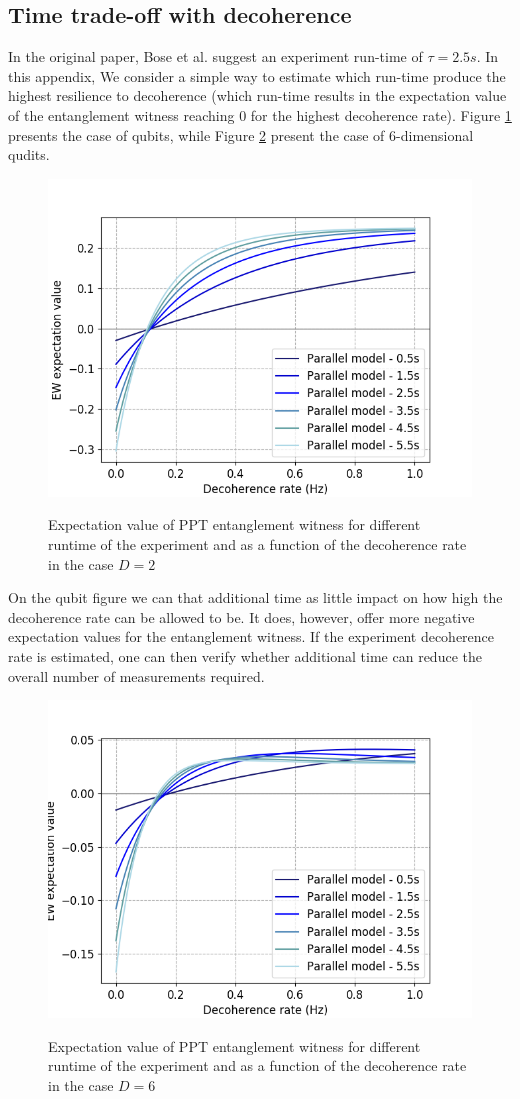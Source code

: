 \documentclass[%
 12pt,
 superscriptaddress,
 amsmath,
 amssymb,
 onecolumn,
 longbibliography
]{revtex4-2}
\begin{document}
\begin{appendices}
\section{Time trade-off with decoherence} \label{sec:time_opt}

\indent In the original paper, Bose et al. suggest an experiment run-time of $\tau=2.5s$. In this appendix, We consider a simple way to estimate which run-time produce the highest resilience to decoherence (which run-time results in the expectation value of the entanglement witness reaching $0$ for the highest decoherence rate). Figure \ref{fig:deco_para_runtime2} presents the case of qubits, while Figure \ref{fig:deco_para_runtime6} present the case of 6-dimensional qudits. 
	\begin{figure}
	\centering
		\includegraphics[width=0.5\columnwidth]{EW_para_deco_diff_time_d2.png}\par\medskip
	    \caption{Expectation value of PPT entanglement witness for different runtime of the experiment and as a function of the decoherence rate in the case $D=2$}\label{fig:deco_para_runtime2}
	\textit{}
	\end{figure}

\indent On the qubit figure we can that additional time as little impact on how high the decoherence rate can be allowed to be. It does, however, offer more negative expectation values for the entanglement witness. If the experiment decoherence rate is estimated, one can then verify whether additional time can reduce the overall number of measurements required.
	\begin{figure}
	\centering
		\includegraphics[width=0.5\columnwidth]{EW_para_deco_diff_time_d6.png}\par\medskip
		\caption{Expectation value of PPT entanglement witness for different runtime of the experiment and as a function of the decoherence rate in the case $D=6$}\label{fig:deco_para_runtime6}
	\textit{}
	\end{figure}	


\end{appendices}
\end{document}
